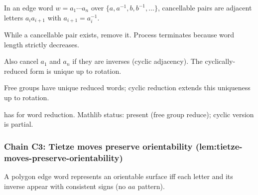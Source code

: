 \begin{lemma}
\label{lem:tcr-r1}
In an edge word $w = a_{1}\cdots a_{n}$ over $\{a, a^{-1}, b, b^{-1}, \ldots\}$, cancellable pairs are adjacent letters $a_{i} a_{i+1}$ with $a_{i+1} = a_{i}^{-1}$.
\leanok
\end{lemma}

\begin{lemma}
\label{lem:tcr-r2}
While a cancellable pair exists, remove it.  Process terminates because word length strictly decreases.
\leanok
\end{lemma}

\begin{lemma}
\label{lem:tcr-r3}
Also cancel $a_{1}$ and $a_{n}$ if they are inverses (cyclic adjacency).  The cyclically-reduced form is unique up to rotation.
\leanok
\end{lemma}

\begin{lemma}
\label{lem:tcr-r4}
Free groups have unique reduced words; cyclic reduction extends this uniqueness up to rotation.
\leanok
\end{lemma}

\begin{lemma}
\label{lem:tcr-r5}
 has  for word reduction.  Mathlib status: present (free group reduce); cyclic version is partial.
\leanok
\end{lemma}

\subsubsection*{Chain C3: Tietze moves preserve orientability (lem:tietze-moves-preserve-orientability)}

\begin{lemma}
\label{lem:tmo-r1}
A polygon edge word represents an orientable surface iff each letter and its inverse appear with consistent signs (no $aa$ pattern).
\leanok
\end{lemma}

